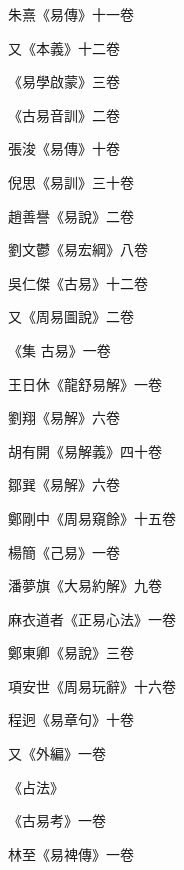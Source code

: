 \begin{pinyinscope}
 朱熹《易傳》十一卷



 又《本義》十二卷



 《易學啟蒙》三卷



 《古易音訓》二卷



 張浚《易傳》十卷



 倪思《易訓》三十卷



 趙善譽《易說》二卷



 劉文鬱《易宏綱》八卷



 吳仁傑《古易》十二卷



 又《周易圖說》二卷



 《集
 古易》一卷



 王日休《龍舒易解》一卷



 劉翔《易解》六卷



 胡有開《易解義》四十卷



 鄒巽《易解》六卷



 鄭剛中《周易窺餘》十五卷



 楊簡《己易》一卷



 潘夢旗《大易約解》九卷



 麻衣道者《正易心法》一卷



 鄭東卿《易說》三卷



 項安世《周易玩辭》十六卷



 程迥《易章句》十卷



 又《外編》一卷



 《占法》



 《古易考》一卷



 林至《易裨傳》一卷




\end{pinyinscope}
